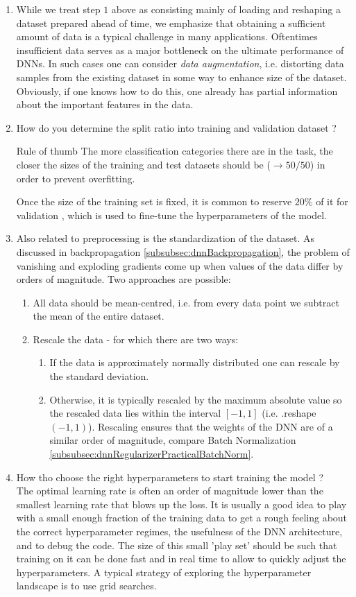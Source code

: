 \begin{enumerate}
	\item While we treat step $1$ above as consisting mainly of loading and reshaping a dataset prepared ahead of time, we emphasize that obtaining a sufficient amount of data is a typical challenge in many applications. Oftentimes insufficient data serves as a major bottleneck on the ultimate performance of DNNs. In such cases one can consider \emph{data augmentation}, i.e. distorting data samples from the existing dataset in some way to enhance size of the dataset. Obviously, if one knows how to do this, one already has partial information about the important features in the data.
	\item How do you determine the split ratio into training and validation dataset ?
	\begin{mybox}{Rule of thumb}
		The more classification categories there are in the task, the closer the sizes of the training and test datasets should be ($\rightarrow 50/50$) in order to prevent overfitting.
	\end{mybox}
	Once the size of the training set is fixed, it is common to reserve $20 \%$ of it for validation , which is used to fine-tune the hyperparameters of the model.
	\item Also related to preprocessing is the standardization of the dataset. As discussed in backpropagation \ref{subsubsec:dnnBackpropagation}, the problem of vanishing and exploding gradients come up when values of the data differ by orders of magnitude. Two approaches are possible:
	\begin{enumerate}
		\item All data should be mean-centred, i.e. from every data point we subtract the mean of the entire dataset.
		\item Rescale the data - for which there are two ways:
		\begin{enumerate}
			\item If the data is approximately normally distributed one can rescale by the standard deviation.
			\item Otherwise, it is typically rescaled by the maximum absolute value so the rescaled data lies within the interval $[-1,1]$ (i.e. .reshape$(-1,1)$). Rescaling ensures that the weights of the DNN are of a similar order of magnitude, compare Batch Normalization \ref{subsubsec:dnnRegularizerPracticalBatchNorm}. 
		\end{enumerate}
	\end{enumerate}
	\item How tho choose the right hyperparameters to start training the model ?\\
	The optimal learning rate is often an order of magnitude lower than the smallest learning rate that blows up the loss. It is usually a good idea to play with a small enough fraction of the training data to get a rough feeling about the correct hyperparameter regimes, the usefulness of the DNN architecture, and to debug the code. The size of this small ’play set’ should be such that training on it can be done fast and in real time to allow to quickly adjust the hyperparameters. A typical strategy of exploring the hyperparameter landscape is to use grid searches.
\end{enumerate}
